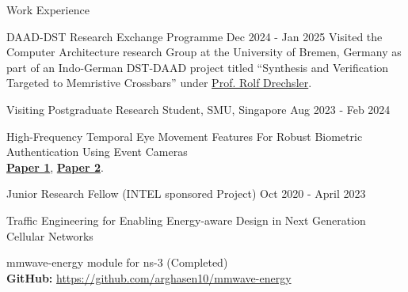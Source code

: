 \documentclass{resume} %
\begin{document}
	
	\begin{rSection}{Work Experience}
		
		\begin{rSubsection}{DAAD-DST Research Exchange Programme}
			{Dec 2024 - Jan 2025}{}{}
			Visited  the Computer Architecture  research Group at the University of Bremen, Germany as part of an Indo-German DST-DAAD project titled “Synthesis and Verification Targeted to Memristive Crossbars” under \href{https://www.rolfdrechsler.de/}{Prof. Rolf Drechsler}.
		\end{rSubsection}
		\begin{rSubsection}{Visiting Postgraduate Research Student, SMU, Singapore}  
			{Aug 2023 - Feb 2024}{}{}
			\item High-Frequency Temporal Eye Movement Features For Robust Biometric Authentication Using Event Cameras\\
			\href{https://dl.acm.org/doi/abs/10.1145/3699745}{\textbf{Paper 1}}, 
		    \href{https://eye-tracking-for-physiological-sensing.github.io/eyegraph/}{\textbf{Paper 2}}.\\
		\end{rSubsection}
		
		
		\begin{rSubsection}{Junior Research Fellow (INTEL sponsored Project)}  
			{Oct 2020 - April 2023}{}{}
				\item Traffic Engineering for Enabling Energy-aware Design in Next Generation Cellular Networks
				\item mmwave-energy module for ns-3 (Completed)\\
				\textbf{GitHub:} \url{https://github.com/arghasen10/mmwave-energy}
		\end{rSubsection}
		

\end{rSection}
\end{document}
